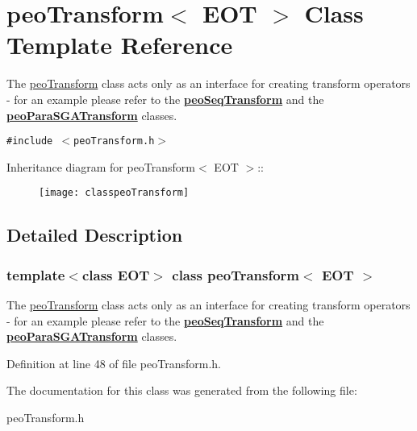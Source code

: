 \hypertarget{classpeoTransform}{
\section{peo\-Transform$<$ EOT $>$ Class Template Reference}
\label{classpeoTransform}
}
The \hyperlink{classpeoTransform}{peo\-Transform} class acts only as an interface for creating transform operators - for an example please refer to the {\bf \hyperlink{classpeoSeqTransform}{peo\-Seq\-Transform}} and the {\bf \hyperlink{classpeoParaSGATransform}{peo\-Para\-SGATransform}} classes.  


{\tt \#include $<$peo\-Transform.h$>$}

Inheritance diagram for peo\-Transform$<$ EOT $>$::\begin{figure}[H]
\begin{center}
\leavevmode
\texttt{[image: classpeoTransform]}
\end{center}
\end{figure}


\subsection{Detailed Description}
\subsubsection*{template$<$class EOT$>$ class peo\-Transform$<$ EOT $>$}

The \hyperlink{classpeoTransform}{peo\-Transform} class acts only as an interface for creating transform operators - for an example please refer to the {\bf \hyperlink{classpeoSeqTransform}{peo\-Seq\-Transform}} and the {\bf \hyperlink{classpeoParaSGATransform}{peo\-Para\-SGATransform}} classes. 



Definition at line 48 of file peo\-Transform.h.

The documentation for this class was generated from the following file:\begin{CompactItemize}
\item 
peo\-Transform.h\end{CompactItemize}
